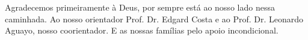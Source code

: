 \begin{agradecimentos}
Agradecemos primeiramente à Deus, por sempre está ao nosso lado nessa caminhada. Ao nosso orientador Prof. Dr. Edgard Costa e ao Prof. Dr. Leonardo Aguayo, nosso coorientador. E as nossas famílias pelo apoio incondicional. 
\end{agradecimentos}